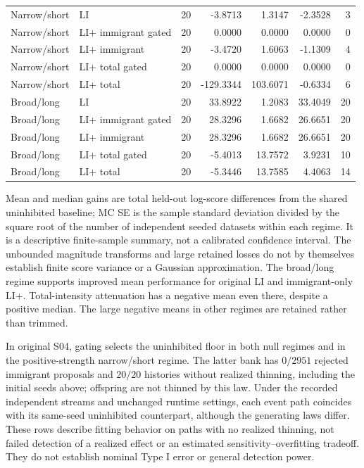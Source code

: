 \begin{longtable}{@{}llrrrrr@{}}
Narrow/short & LI & 20 & -3.8713 & 1.3147 & -2.3528 & 3 \\

Narrow/short & LI+ immigrant gated & 20 & 0.0000 & 0.0000 & 0.0000 & 0 \\

Narrow/short & LI+ immigrant & 20 & -3.4720 & 1.6063 & -1.1309 & 4 \\

Narrow/short & LI+ total gated & 20 & 0.0000 & 0.0000 & 0.0000 & 0 \\

Narrow/short & LI+ total & 20 & -129.3344 & 103.6071 & -0.6334 & 6 \\

Broad/long & LI & 20 & 33.8922 & 1.2083 & 33.4049 & 20 \\

Broad/long & LI+ immigrant gated & 20 & 28.3296 & 1.6682 & 26.6651 & 20 \\

Broad/long & LI+ immigrant & 20 & 28.3296 & 1.6682 & 26.6651 & 20 \\

Broad/long & LI+ total gated & 20 & -5.4013 & 13.7572 & 3.9231 & 10 \\

Broad/long & LI+ total & 20 & -5.3446 & 13.7585 & 4.4063 & 14 \\

\end{longtable}\endgroup

Mean and median gains are total held-out log-score differences from the shared uninhibited baseline; MC SE is the sample standard deviation divided by the square root of the number of independent seeded datasets within each regime. It is a descriptive finite-sample summary, not a calibrated confidence interval. The unbounded magnitude transforms and large retained losses do not by themselves establish finite score variance or a Gaussian approximation. The broad/long regime supports improved mean performance for original LI and immigrant-only LI+. Total-intensity attenuation has a negative mean even there, despite a positive median. The large negative means in other regimes are retained rather than trimmed.

In original S04, gating selects the uninhibited floor in both null regimes and in the positive-strength narrow/short regime. The latter bank has $0/2951$ rejected immigrant proposals and $20/20$ histories without realized thinning, including the initial seeds above; offspring are not thinned by this law. Under the recorded independent streams and unchanged runtime settings, each event path coincides with its same-seed uninhibited counterpart, although the generating laws differ. These rows describe fitting behavior on paths with no realized thinning, not failed detection of a realized effect or an estimated sensitivity--overfitting tradeoff. They do not establish nominal Type I error or general detection power.

